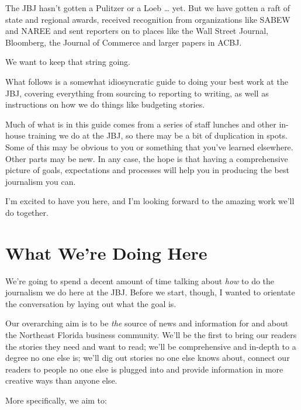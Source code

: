 \documentclass[
  12pt,
  american,
  letterpaperpaper,
  extrafontsizes,onecolumn,openright
  ]{memoir}
\begin{document}
The JBJ hasn't gotten a Pulitzer or a Loeb \ldots{} yet. But we have gotten a raft of state and regional awards, received recognition from organizations like SABEW and NAREE and sent reporters on to places like the Wall Street Journal, Bloomberg, the Journal of Commerce and larger papers in ACBJ.

We want to keep that string going.

What follows is a somewhat idiosyncratic guide to doing your best work at the JBJ, covering everything from sourcing to reporting to writing, as well as instructions on how we do things like budgeting stories.

Much of what is in this guide comes from a series of staff lunches and other in-house training we do at the JBJ, so there may be a bit of duplication in spots. Some of this may be obvious to you or something that you've learned elsewhere. Other parts may be new. In any case, the hope is that having a comprehensive picture of goals, expectations and processes will help you in producing the best journalism you can.

I'm excited to have you here, and I'm looking forward to the amazing work we'll do together.

\hypertarget{what-were-doing-here}{%
\chapter{What We're Doing Here}\label{what-were-doing-here}}

We're going to spend a decent amount of time talking about \emph{how} to do the journalism we do here at the JBJ. Before we start, though, I wanted to orientate the conversation by laying out what the goal is.

Our overarching aim is to be \emph{the} source of news and information for and about the Northeast Florida business community. We'll be the first to bring our readers the stories they need and want to read; we'll be comprehensive and in-depth to a degree no one else is; we'll dig out stories no one else knows about, connect our readers to people no one else is plugged into and provide information in more creative ways than anyone else.

More specifically, we aim to:
\end{document}
